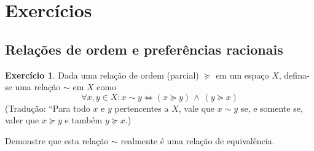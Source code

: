 \documentclass[12pt]{article}
\numberwithin{equation}{section}
\theoremstyle{plain}
\theoremstyle{definition}
\newtheorem{exercise}{Exercício}
\theoremstyle{remark}
\begin{document}
\section{Exercícios} 
\setcounter{exercise}{0}
\subsection{Relações de ordem e preferências racionais}
\begin{exercise}
  Dada uma relação de ordem (parcial) \(\succeq\) em um espaço \(X\), defina-se uma relação \(\sim\) em $X$ como \[
  \forall x, y \in X: x \sim y \iff (x \succeq y)\,  \land  \, (y \succeq x)
  \] 
  (Tradução: ``Para todo \(x\) e \(y\) pertencentes a \(X\), vale que \(x \sim y\) se, e somente se, valer que \(x \succeq y\) e também \(y \succeq x\).) 
  
  Demonstre que esta relação $\sim$ realmente é uma relação de equivalência.  
  
\end{exercise}
\end{document}
